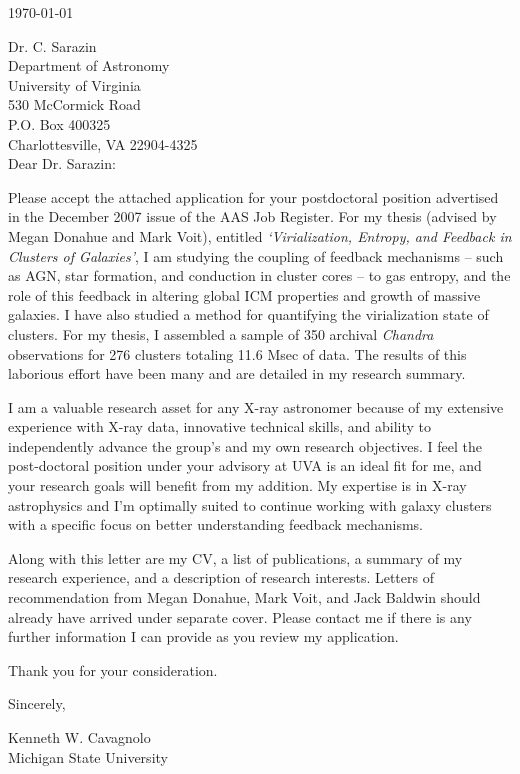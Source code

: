 \documentclass[11pt]{article}
\begin{document}
\today

Dr. C. Sarazin\\
Department of Astronomy\\
University of Virginia\\
530 McCormick Road\\
P.O. Box 400325\\
Charlottesville, VA 22904-4325\\

Dear Dr. Sarazin:

Please accept the attached application for your postdoctoral
position advertised in the December 2007 issue of the AAS Job
Register. For my thesis (advised by Megan Donahue and Mark Voit),
entitled {\it `Virialization, Entropy, and Feedback in Clusters of
Galaxies'}, I am studying the coupling of feedback mechanisms -- such
as AGN, star formation, and conduction in cluster cores -- to gas
entropy, and the role of this feedback in altering global ICM
properties and growth of massive galaxies. I have also studied a
method for quantifying the virialization state of clusters. For my
thesis, I assembled a sample of 350 archival {\it Chandra}
observations for 276 clusters totaling 11.6 Msec of data. The results
of this laborious effort have been many and are detailed in my
research summary.

I am a valuable research asset for any X-ray astronomer because of my
extensive experience with X-ray data, innovative technical skills, and
ability to independently advance the group's and my own research
objectives. I feel the post-doctoral position under your advisory at
UVA is an ideal fit for me, and your research goals will benefit
from my addition. My expertise is in X-ray astrophysics and I'm optimally
suited to continue working with galaxy clusters with a specific focus on
better understanding feedback mechanisms.


Along with this letter are my CV, a list of publications, a summary of
my research experience, and a description of research interests. Letters of
recommendation from Megan Donahue, Mark Voit, and Jack Baldwin should
already have arrived under separate cover. Please contact me if there
is any further information I can provide as you review my application.

Thank you for your consideration.

Sincerely,\\
\begin{minipage}{7.5in}
\end{minipage}
Kenneth W. Cavagnolo\\
Michigan State University
\end{document}
